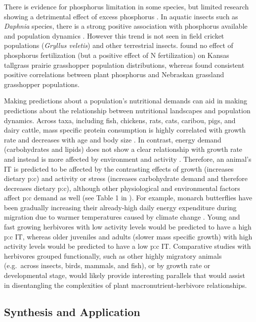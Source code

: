 \documentclass[
]{article}
\begin{document}
There is evidence for phosphorus limitation in some species, but limited
research showing a detrimental effect of excess phosphorus
\citep{cease_dietary_2016}. In aquatic insects such as \emph{Daphnia}
species, there is a strong positive association with phosphorus
available and population dynamics \citet{andersen_stoichiometry_2004}.
However this trend is not seen in field cricket populations
(\emph{Gryllus veletis}) \citep{harrison_synthesis_2014} and other
terrestrial insects. \citet{loaiza2011} found no effect of phosphorus
fertilization (but a positive effect of N fertilization) on Kansas
tallgrass prairie grasshopper population distributions, whereas
\citet{joern_not_2012} found consistent positive correlations between
plant phosphorus and Nebraskan grassland grasshopper populations.

Making predictions about a population's nutritional demands can aid in
making predictions about the relationship between nutritional landscapes
and population dynamics. Across taxa, including fish, chickens, rats,
cats, caribou, pigs, and dairy cattle, mass specific protein consumption
is highly correlated with growth rate and decreases with age and body
size \citep{talal_body_2023}. In contrast, energy demand (carbohydrates
and lipids) does not show a clear relationship with growth rate and
instead is more affected by environment and activity
\citep{talal_body_2023}. Therefore, an animal's IT is predicted to be
affected by the contrasting effects of growth (increases dietary p:c)
and activity or stress (increases carbohydrate demand and therefore
decreases dietary p:c), although other physiological and environmental
factors affect p:c demand as well (see Table 1 in
\citet{cease_how_2024}). For example, monarch butterflies have been
gradually increasing their already-high daily energy expenditure during
migration due to warmer temperatures caused by climate change
\citep{parlin_cost_2023}. Young and fast growing herbivores with low
activity levels would be predicted to have a high p:c IT, whereas older
juveniles and adults (slower mass specific growth) with high activity
levels would be predicted to have a low p:c IT. Comparative studies with
herbivores grouped functionally, such as other highly migratory animals
(e.g.~across insects, birds, mammals, and fish), or by growth rate or
developmental stage, would likely provide interesting parallels that
would assist in disentangling the complexities of plant
macronutrient-herbivore relationships.

\subsection{Synthesis and Application}\label{synthesis-and-application}
\end{document}

